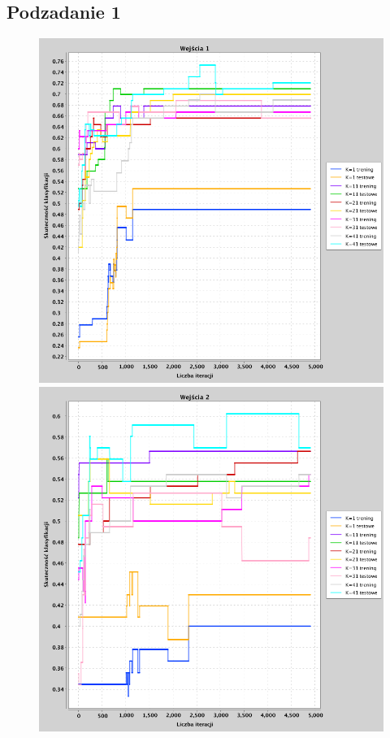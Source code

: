 \documentclass[a4paper, portrait,11pt]{article}
\begin{document}
\subsection{Podzadanie 1}
\begin{figure}[!htb]
  \begin{minipage}{0.33\textwidth}
    \centering
    \includegraphics[width=1\linewidth]{../data/classification4/1/1_1.png}
    \caption{\label{fig:41_1_1}}
  \end{minipage}
  \begin{minipage}{0.33\textwidth}
    \centering
    \includegraphics[width=1\linewidth]{../data/classification4/1/1_2.png}

\end{minipage}
\end{figure}
\end{document}
